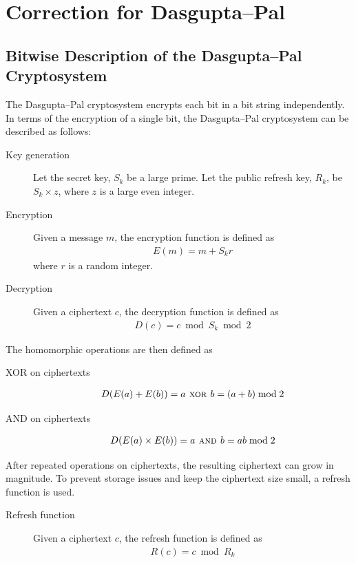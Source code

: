 \section{Correction for Dasgupta--Pal}
\label{chap:correction}
\subsection{Bitwise Description of the Dasgupta--Pal Cryptosystem}
The Dasgupta--Pal cryptosystem \cite{dasgupta_design_2016} encrypts each bit in a bit string independently.
In terms of the encryption of a single bit, the Dasgupta--Pal cryptosystem can be described as follows:
\begin{description}
	\item[Key generation]
	Let the secret key, $S_k$ be a large prime.
	Let the public refresh key, $R_k$, be $S_k \times z$, where $z$ is a large even integer.
	\item[Encryption]
	Given a message $m$, the encryption function is defined as
	\begin{align*}
		E(m) = m + S_kr
	\end{align*}
	where $r$ is a random integer.
	\item[Decryption]
	Given a ciphertext $c$, the decryption function is defined as
	\begin{align*}
		D(c) = c \bmod S_k \bmod 2
	\end{align*}
\end{description}
The homomorphic operations are then defined as
\begin{description}
	\item[XOR on ciphertexts]
	\begin{align*}
		D(E(a)+E(b)) = a \textsc{ xor } b = (a + b) \bmod 2
	\end{align*}
	\item[AND on ciphertexts]
	\begin{align*}
		D(E(a)\times E(b)) = a \textsc{ and } b = ab \bmod 2
	\end{align*}
\end{description}
After repeated operations on ciphertexts, the resulting ciphertext can grow in magnitude.
To prevent storage issues and keep the ciphertext size small, a refresh function is used.
\begin{description}
	\item[Refresh function]
	Given a ciphertext $c$, the refresh function is defined as
	\begin{align*}
		R(c) = c \bmod R_k
	\end{align*}
\end{description}
